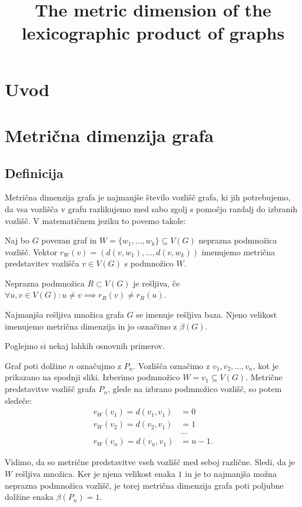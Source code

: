 \documentclass[mat1, tisk]{fmfdelo}
\title{The metric dimension of the lexicographic product of graphs}
\begin{document}
\section{Uvod}
\section{Metrična dimenzija grafa}


\subsection{Definicija}

Metrična dimenzija grafa je najmanjše število vozlišč grafa, ki jih potrebujemo, da
vsa vozlišča v grafu razlikujemo med sabo zgolj s pomočjo razdalj do izbranih vozlišč.
V matematičnem jeziku to povemo takole:

\begin{definicija}
    Naj bo $G$ povezan graf in $W = \{ w_1, ... , w_k  \} \subseteq V(G)$ neprazna podmnožica vozlišč. 
    Vektor $r_W(v) = (d(v, w_1), ..., d(v, w_k))$ imenujemo metrična predstavitev vozlišča $v \in V(G)$ s podmnožico $W$.
\end{definicija}

\begin{definicija}
    Neprazna podmnožica $R \subset V(G)$ je rešljiva,
    če $\forall u, v \in V(G): u \neq v \implies r_R(v) \neq r_R(u)$.
\end{definicija}

\begin{definicija}
    Najmanjša rešljiva množica grafa $G$ se imenuje rešljiva baza. Njeno velikost imenujemo metrična dimenzija in jo označimo z $\beta(G).$ 
\end{definicija}

Poglejmo si nekaj lahkih osnovnih primerov.

\begin{primer} \label{primer_2.4.}
Graf poti dolžine $n$ označujmo z $P_n$. Vozlišča označimo z $v_1, v_2, ..., v_n$, kot 
je prikazano na spodnji sliki. Izberimo podmnožico $W = {v_1} \subseteq V(G).$ 
Metrične predstavitve vozlišč grafa $P_n$, glede na izbrano podmnožico vozlišč, so potem sledeče:
\begin{align*}
    r_W(v_1) = d(v_1, v_1) & = 0 \\
    r_W(v_2) = d(v_2, v_1) & = 1 \\
    & \dots \\
    r_W(v_n) = d(v_n, v_1) & = n-1.
\end{align*}

Vidimo, da so metrične predstavitve vseh vozlišč med seboj različne.
Sledi, da je $W$ rešljiva množica. Ker je njena velikost enaka $1$ in je to najmanjša možna neprazna 
podmnožica vozlišč, je torej metrična dimenzija
grafa poti poljubne dolžine enaka $\beta(P_n) = 1.$
\end{primer}
\end{document}
